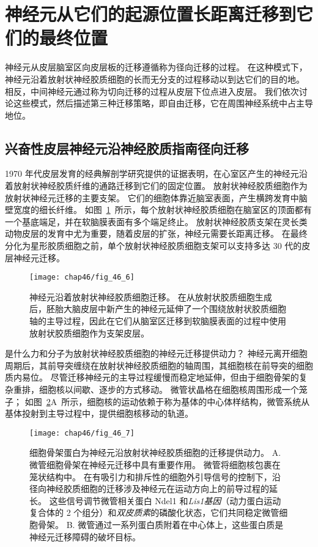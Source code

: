 \section{神经元从它们的起源位置长距离迁移到它们的最终位置}

神经元从皮层脑室区向皮层板的迁移遵循称为径向迁移的过程。
在这种模式下，神经元沿着放射状神经胶质细胞的长而无分支的过程移动以到达它们的目的地。
相反，中间神经元通过称为切向迁移的过程从皮层下位点进入皮层。
我们依次讨论这些模式，然后描述第三种迁移策略，即自由迁移，它在周围神经系统中占主导地位。



\subsection{兴奋性皮层神经元沿神经胶质指南径向迁移}

1970 年代皮层发育的经典解剖学研究提供的证据表明，在心室区产生的神经元沿着放射状神经胶质纤维的通路迁移到它们的固定位置。
放射状神经胶质细胞作为放射状神经元迁移的主要支架。
它们的细胞体靠近脑室表面，产生横跨发育中脑壁宽度的细长纤维。
如图~\ref{fig:46_6}~所示，每个放射状神经胶质细胞在脑室区的顶面都有一个基底端足，并在软脑膜表面有多个端足终止。
放射状神经胶质支架在灵长类动物皮层的发育中尤为重要，随着皮层的扩张，神经元需要长距离迁移。
在最终分化为星形胶质细胞之前，单个放射状神经胶质细胞支架可以支持多达 30 代的皮层神经元迁移。


\begin{figure}[htbp]
	\centering
	\texttt{[image: chap46/fig\_46\_6]}
	\caption{神经元沿着放射状神经胶质细胞迁移。
		在从放射状胶质细胞生成后，胚胎大脑皮层中新产生的神经元延伸了一个围绕放射状胶质细胞轴的主导过程，因此在它们从脑室区迁移到软脑膜表面的过程中使用放射状胶质细胞作为支架皮层。}
	\label{fig:46_6}
\end{figure}


是什么力和分子为放射状神经胶质细胞的神经元迁移提供动力？
神经元离开细胞周期后，其前导突缠绕在放射状神经胶质细胞的轴周围，其细胞核在前导突的细胞质内易位。
尽管迁移神经元的主导过程缓慢而稳定地延伸，但由于细胞骨架的复杂重排，细胞核以间歇、逐步的方式移动。 
微管状晶格在细胞核周围形成一个笼子；
如图~\ref{fig:46_7}A~所示，细胞核的运动依赖于称为基体的中心体样结构，微管系统从基体投射到主导过程中，提供细胞核移动的轨道。


\begin{figure}[htbp]
	\centering
	\texttt{[image: chap46/fig\_46\_7]}
	\caption{细胞骨架蛋白为神经元沿放射状神经胶质细胞的迁移提供动力。
		A. 微管细胞骨架在神经元迁移中具有重要作用。
		微管将细胞核包裹在笼状结构中。
		在有吸引力和排斥性的细胞外引导信号的控制下，沿径向神经胶质细胞的迁移涉及神经元在运动方向上的前导过程的延长。
		这些信号调节微管相关蛋白 Ndel1 和\textit{Lis1基因}（动力蛋白运动复合体的 2 个组分）和\textit{双皮质素}的磷酸化状态，它们共同稳定微管细胞骨架\cite{gleeson2000neuronal}。
		B. 微管通过一系列蛋白质附着在中心体上，这些蛋白质是神经元迁移障碍的破坏目标。}
	\label{fig:46_7}
\end{figure}


